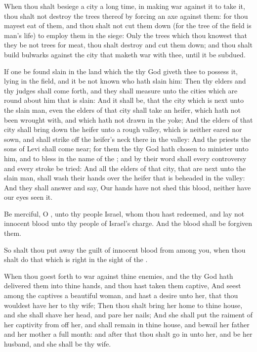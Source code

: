 \Verse When thou shalt besiege a city a long time, in making war against it to take it, thou shalt not destroy the trees thereof by forcing an axe against them: for thou mayest eat of them, and thou shalt not cut them down (for the tree of the field is man's life) to employ them in the siege: \Verse Only the trees which thou knowest that they be not trees for meat, thou shalt destroy and cut them down; and thou shalt build bulwarks against the city that maketh war with thee, until it be subdued.


\Chapter
\Verse If one be found slain in the land which the \LORD thy God giveth thee to possess it, lying in the field, and it be not known who hath slain him: \Verse Then thy elders and thy judges shall come forth, and they shall measure unto the cities which are round about him that is slain: \Verse And it shall be, that the city which is next unto the slain man, even the elders of that city shall take an heifer, which hath not been wrought with, and which hath not drawn in the yoke; \Verse And the elders of that city shall bring down the heifer unto a rough valley, which is neither eared nor sown, and shall strike off the heifer's neck there in the valley: \Verse And the priests the sons of Levi shall come near; for them the \LORD thy God hath chosen to minister unto him, and to bless in the name of the \LORD; and by their word shall every controversy and every stroke be tried: \Verse And all the elders of that city, that are next unto the slain man, shall wash their hands over the heifer that is beheaded in the valley: \Verse And they shall answer and say, Our hands have not shed this blood, neither have our eyes seen it.

\Verse Be merciful, O \LORD, unto thy people Israel, whom thou hast redeemed, and lay not innocent blood unto thy people of Israel's charge. And the blood shall be forgiven them.

\Verse So shalt thou put away the guilt of innocent blood from among you, when thou shalt do that which is right in the sight of the \LORD.

\Verse When thou goest forth to war against thine enemies, and the \LORD thy God hath delivered them into thine hands, and thou hast taken them captive, \Verse And seest among the captives a beautiful woman, and hast a desire unto her, that thou wouldest have her to thy wife; \Verse Then thou shalt bring her home to thine house, and she shall shave her head, and pare her nails; \Verse And she shall put the raiment of her captivity from off her, and shall remain in thine house, and bewail her father and her mother a full month: and after that thou shalt go in unto her, and be her husband, and she shall be thy wife.

